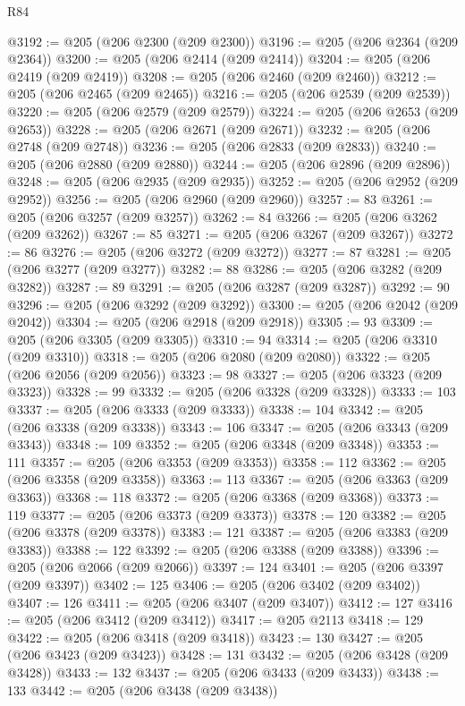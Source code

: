 \begin{lexlean}{R84}
\begin{coremodule}
@3192 := @205 (@206 @2300 (@209 @2300))
@3196 := @205 (@206 @2364 (@209 @2364))
@3200 := @205 (@206 @2414 (@209 @2414))
@3204 := @205 (@206 @2419 (@209 @2419))
@3208 := @205 (@206 @2460 (@209 @2460))
@3212 := @205 (@206 @2465 (@209 @2465))
@3216 := @205 (@206 @2539 (@209 @2539))
@3220 := @205 (@206 @2579 (@209 @2579))
@3224 := @205 (@206 @2653 (@209 @2653))
@3228 := @205 (@206 @2671 (@209 @2671))
@3232 := @205 (@206 @2748 (@209 @2748))
@3236 := @205 (@206 @2833 (@209 @2833))
@3240 := @205 (@206 @2880 (@209 @2880))
@3244 := @205 (@206 @2896 (@209 @2896))
@3248 := @205 (@206 @2935 (@209 @2935))
@3252 := @205 (@206 @2952 (@209 @2952))
@3256 := @205 (@206 @2960 (@209 @2960))
@3257 := 83
@3261 := @205 (@206 @3257 (@209 @3257))
@3262 := 84
@3266 := @205 (@206 @3262 (@209 @3262))
@3267 := 85
@3271 := @205 (@206 @3267 (@209 @3267))
@3272 := 86
@3276 := @205 (@206 @3272 (@209 @3272))
@3277 := 87
@3281 := @205 (@206 @3277 (@209 @3277))
@3282 := 88
@3286 := @205 (@206 @3282 (@209 @3282))
@3287 := 89
@3291 := @205 (@206 @3287 (@209 @3287))
@3292 := 90
@3296 := @205 (@206 @3292 (@209 @3292))
@3300 := @205 (@206 @2042 (@209 @2042))
@3304 := @205 (@206 @2918 (@209 @2918))
@3305 := 93
@3309 := @205 (@206 @3305 (@209 @3305))
@3310 := 94
@3314 := @205 (@206 @3310 (@209 @3310))
@3318 := @205 (@206 @2080 (@209 @2080))
@3322 := @205 (@206 @2056 (@209 @2056))
@3323 := 98
@3327 := @205 (@206 @3323 (@209 @3323))
@3328 := 99
@3332 := @205 (@206 @3328 (@209 @3328))
@3333 := 103
@3337 := @205 (@206 @3333 (@209 @3333))
@3338 := 104
@3342 := @205 (@206 @3338 (@209 @3338))
@3343 := 106
@3347 := @205 (@206 @3343 (@209 @3343))
@3348 := 109
@3352 := @205 (@206 @3348 (@209 @3348))
@3353 := 111
@3357 := @205 (@206 @3353 (@209 @3353))
@3358 := 112
@3362 := @205 (@206 @3358 (@209 @3358))
@3363 := 113
@3367 := @205 (@206 @3363 (@209 @3363))
@3368 := 118
@3372 := @205 (@206 @3368 (@209 @3368))
@3373 := 119
@3377 := @205 (@206 @3373 (@209 @3373))
@3378 := 120
@3382 := @205 (@206 @3378 (@209 @3378))
@3383 := 121
@3387 := @205 (@206 @3383 (@209 @3383))
@3388 := 122
@3392 := @205 (@206 @3388 (@209 @3388))
@3396 := @205 (@206 @2066 (@209 @2066))
@3397 := 124
@3401 := @205 (@206 @3397 (@209 @3397))
@3402 := 125
@3406 := @205 (@206 @3402 (@209 @3402))
@3407 := 126
@3411 := @205 (@206 @3407 (@209 @3407))
@3412 := 127
@3416 := @205 (@206 @3412 (@209 @3412))
@3417 := @205 @2113
@3418 := 129
@3422 := @205 (@206 @3418 (@209 @3418))
@3423 := 130
@3427 := @205 (@206 @3423 (@209 @3423))
@3428 := 131
@3432 := @205 (@206 @3428 (@209 @3428))
@3433 := 132
@3437 := @205 (@206 @3433 (@209 @3433))
@3438 := 133
@3442 := @205 (@206 @3438 (@209 @3438))

\end{coremodule}
\end{lexlean}
